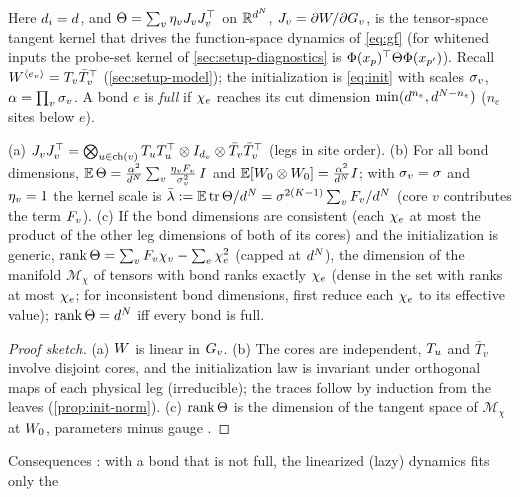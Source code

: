Here $\pd[i]=d$, and $\TK=\sum_v\lrm vJ_vJ_v\T$ on $\R^{d^\Ns}$, $J_v=\partial\W/\partial\G v$, is the tensor-space
tangent kernel that drives the function-space dynamics of \eqref{eq:gf} (for whitened inputs the probe-set
kernel of \cref{sec:setup-diagnostics} is $\Feat(x_p)\T\TK\Feat(x_{p'})$). Recall $\mat{\W}{\edge v}=\Sub v\bar T_v\T$
(\cref{sec:setup-model}); the initialization is \eqref{eq:init} with scales $\iscv v$, $\fsc=\prod_v\iscv v$. A bond
$e$ is \emph{full} if $\bd e$ reaches its cut dimension $\min(d^{n_e},d^{\Ns-n_e})$ ($n_e$ sites below $e$).

\begin{proposition}\label{prop:A-kernel}
  \proven{} 
  (a) $J_vJ_v\T=\bigotimes_{u\in\ch v}\Sub u\Sub u\T\otimes\Id_{d_v}\otimes\bar T_v\bar T_v\T$ (legs in site order).
  (b) For all bond dimensions, $\E\,\TK=\frac{\fsc^2}{d^\Ns}\sum_v\frac{\lrm v\fanin v}{\iscv v^2}\,\Id$ and
  $\E[\Wz\otimes\Wz]=\frac{\fsc^2}{d^\Ns}\Id$; with $\iscv v=\isc$ and $\lrm v=1$ the kernel scale is
  $\bar\lambda:=\E\tr\TK/d^\Ns=\isc^{2(\Kc-1)}\sum_v\fanin v/d^\Ns$ (core $v$ contributes the term $\fanin v$).
  (c) If the bond dimensions are consistent (each $\bd e$ at most the product of the other leg dimensions of
  both of its cores) and the initialization is generic, $\rank\TK=\sum_v\fanin v\bd v-\sum_e\bd e^2$ (capped at $d^\Ns$),
  the dimension of the manifold $\mathcal M_\chi$ of tensors with bond ranks exactly $\bd e$ (dense in the set with
  ranks at most $\bd e$; for inconsistent bond
  dimensions, first reduce each $\bd e$ to its effective value); $\rank\TK=d^\Ns$ iff every bond is full.
\end{proposition}
\begin{proof}[Proof sketch]
  (a) $\W$ is linear in $\G v$. (b) The cores are independent, $\Sub u$ and $\bar T_v$ involve disjoint cores, and the
  initialization law is invariant under orthogonal maps of each physical leg (irreducible); the traces
  follow by induction from the leaves (\cref{prop:init-norm}). (c) $\rank\TK$ is the dimension of the tangent
  space of $\mathcal M_\chi$ at $\Wz$, parameters minus gauge \citep[Thms~2 and~4]{uschmajew2013geometry}.
\end{proof}
Consequences \derived: with a bond that is not full, the linearized (lazy) dynamics fits only the
